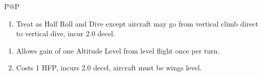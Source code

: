 \begin{twocolumntablefloat}
\begin{twocolumntable}
\begin{tabularx}{\linewidth}{P@{\hspace{1em}}P}

            \begin{enumerate}[nosep]
                \item Treat as Half Roll and Dive except aircraft may go from vertical climb direct to vertical dive, incur 2.0 decel.
            \end{enumerate}


            \begin{enumerate}[nosep]
                \item Allows gain of one Altitude Level from level flight once per turn.
                \item Costs 1 HFP, incurs 2.0 decel, aircraft must be wings level.
            \end{enumerate}

            \\
            \bottomrule
        \end{tabularx}
    \end{twocolumntable}
\end{twocolumntablefloat}
